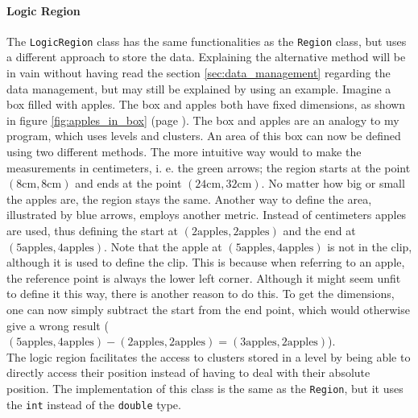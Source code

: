 \documentclass[10pt,a4paper,titlepage]{article}
\begin{document}
	\paragraph{Logic Region}
	The \verb|LogicRegion| class has the same functionalities as the \verb|Region| class, but uses a different approach to store the data. Explaining the alternative method will be in vain without having read the section \ref{sec:data_management} regarding the data management, but may still be explained by using an example.
	Imagine a box filled with apples. The box and apples both have fixed dimensions, as shown in figure \ref{fig:apples_in_box} (page \pageref{fig:apples_in_box}). The box and apples are an analogy to my program, which uses levels and clusters. An area of this box can now be defined using two different methods. The more intuitive way would to make the measurements in centimeters, i. e. the green arrows; the region starts at the point \((8\text{cm},8\text{cm})\) and ends at the point \((24\text{cm}, 32\text{cm})\). No matter how big or small the apples are, the region stays the same. Another way to define the area, illustrated by blue arrows, employs another metric. Instead of centimeters apples are used, thus defining the start at \((2\text{apples},2\text{apples})\) and the end at \((5\text{apples},4\text{apples})\). Note that the apple at \((5\text{apples},4\text{apples})\) is not in the clip, although it is used to define the clip. This is because when referring to an apple, the reference point is always the lower left corner. Although it might seem unfit to define it this way, there is another reason to do this. To get the dimensions, one can now simply subtract the start from the end point, which would otherwise give a wrong result (\((5\text{apples},4\text{apples}) - (2\text{apples},2\text{apples}) = (3\text{apples},2\text{apples})\)).\\
	The logic region facilitates the access to clusters stored in a level by being able to directly access their position instead of having to deal with their absolute position. The implementation of this class is the same as the \verb|Region|, but it uses the \verb|int| instead of the \verb|double| type.
\end{document}
